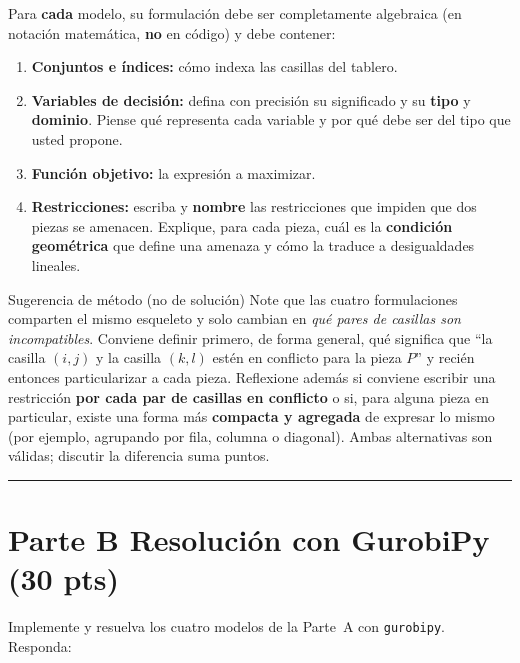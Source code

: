 \documentclass[12pt,a4paper]{article}
\begin{document}
Para \textbf{cada} modelo, su formulación debe ser completamente algebraica (en
notación matemática, \textbf{no} en código) y debe contener:

\begin{enumerate}[label=\arabic*., leftmargin=*, topsep=2pt]
    \item \textbf{Conjuntos e índices:} cómo indexa las casillas del tablero.
    \item \textbf{Variables de decisión:} defina con precisión su significado y su
          \textbf{tipo} y \textbf{dominio}. Piense qué representa cada variable y
          por qué debe ser del tipo que usted propone.
    \item \textbf{Función objetivo:} la expresión a maximizar.
    \item \textbf{Restricciones:} escriba y \textbf{nombre} las restricciones que
          impiden que dos piezas se amenacen. Explique, para cada pieza, cuál es la
          \textbf{condición geométrica} que define una amenaza y cómo la traduce a
          desigualdades lineales.
\end{enumerate}

\begin{ayuda}{Sugerencia de método (no de solución)}
\vspace{2pt}
Note que las cuatro formulaciones comparten el mismo esqueleto y solo cambian en
\emph{qué pares de casillas son incompatibles}. Conviene definir primero, de forma
general, qué significa que ``la casilla $(i,j)$ y la casilla $(k,l)$ estén en
conflicto para la pieza $P$'' y recién entonces particularizar a cada pieza.
Reflexione además si conviene escribir una restricción \textbf{por cada par de
casillas en conflicto} o si, para alguna pieza en particular, existe una forma más
\textbf{compacta y agregada} de expresar lo mismo (por ejemplo, agrupando por fila,
columna o diagonal). Ambas alternativas son válidas; discutir la diferencia suma
puntos.
\end{ayuda}

\noindent\rule{\linewidth}{0.4pt}

\section*{Parte B \quad Resolución con GurobiPy \hfill\normalfont\normalsize(30 pts)}

Implemente y resuelva los cuatro modelos de la Parte~A con \texttt{gurobipy}.
Responda:
\end{document}
